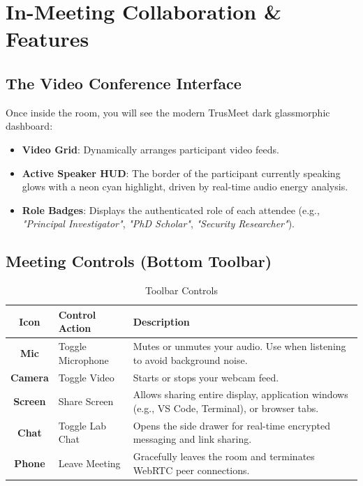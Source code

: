 \documentclass[11pt,a4paper]{report}
\begin{document}
\chapter{In-Meeting Collaboration \& Features}

\section{The Video Conference Interface}
Once inside the room, you will see the modern TrusMeet dark glassmorphic dashboard:
\begin{itemize}
    \item \textbf{Video Grid}: Dynamically arranges participant video feeds.
    \item \textbf{Active Speaker HUD}: The border of the participant currently speaking glows with a neon cyan highlight, driven by real-time audio energy analysis.
    \item \textbf{Role Badges}: Displays the authenticated role of each attendee (e.g., \textit{"Principal Investigator"}, \textit{"PhD Scholar"}, \textit{"Security Researcher"}).
\end{itemize}

\section{Meeting Controls (Bottom Toolbar)}
\begin{table}[h!]
\centering
\small
\begin{tabularx}{\textwidth}{cp{4cm}X}
\toprule
\textbf{Icon} & \textbf{Control Action} & \textbf{Description} \\
\midrule
\textbf{Mic} & Toggle Microphone & Mutes or unmutes your audio. Use when listening to avoid background noise. \\
\textbf{Camera} & Toggle Video & Starts or stops your webcam feed. \\
\textbf{Screen} & Share Screen & Allows sharing entire display, application windows (e.g., VS Code, Terminal), or browser tabs. \\
\textbf{Chat} & Toggle Lab Chat & Opens the side drawer for real-time encrypted messaging and link sharing. \\
\textbf{Phone} & Leave Meeting & Gracefully leaves the room and terminates WebRTC peer connections. \\
\bottomrule
\end{tabularx}
\caption{Toolbar Controls}
\end{table}
\end{document}
